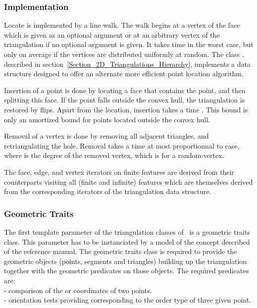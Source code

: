 \subsubsection{Implementation}

Locate is implemented by a line walk. The walk
begins  at  a vertex of the face which
is given
as an optional argument  or at an arbitrary vertex of the triangulation
 if no optional argument is given. It takes
time  in the worst case, but only 
on average if the vertices are distributed uniformly at random.
The class ,
described in section~\ref{Section_2D_Triangulations_Hierarchy}, 
implements a data structure  designed to
offer an alternate  more efficient point location algorithm.

Insertion of a point is done by locating a face that contains the
point, and then splitting this face.
If the point falls outside the convex hull, the triangulation
 is restored by flips.  Apart from the location, insertion takes a
time . This bound is only an amortized bound
for points located outside the convex hull.

Removal of a vertex is done by removing all adjacent triangles, and
retriangulating the hole. Removal takes a time  at most proportionnal to
 case, where
  is the degree of the removed vertex,
which is  for a random vertex.

The face, edge, and vertex iterators on finite features
are derived from their counterparts visiting all (finite and infinite)
features which are themselves derived from the corresponding iterators
of the triangulation data structure.


\subsubsection{ Geometric Traits}
\label{Subsubsection_2D_Triangulation_Basic_Geomrtric_Traits}

The first template parameter of the triangulation classes of \cgal\ 
is a geometric traits class. This parameter has to be instanciated by
a model of the concept
 described  of the reference manual.
 The geometric traits class 
is required to provide
the geometric objects (points, segments and triangles)
building up the triangulation
together with the geometric predicates on those objects.
The required predicates are: \\
- comparison of the  or  coordinates of two points.\\
- orientation tests providing \ccc{CGAL_orientation}
  corresponding to the order type of three given point.

